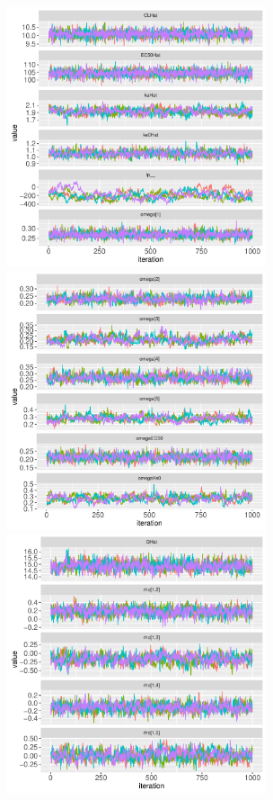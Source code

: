 \documentclass[11pt]{amsart}
\begin{document}
\clearpage

\begin{figure}[!htb]
\includegraphics[width=3.0in,trim=0in 0in 0 0in]{graphics/effCptModelTorsten_0.82/effCptPlots001.pdf}
\includegraphics[width=3.0in,trim=0in 0in 0 0in]{graphics/effCptModelTorsten_0.82/effCptPlots002.pdf}
\includegraphics[width=3.0in,trim=0in 0in 0 0in]{graphics/effCptModelTorsten_0.82/effCptPlots003.pdf}

\end{figure}
\end{document}
